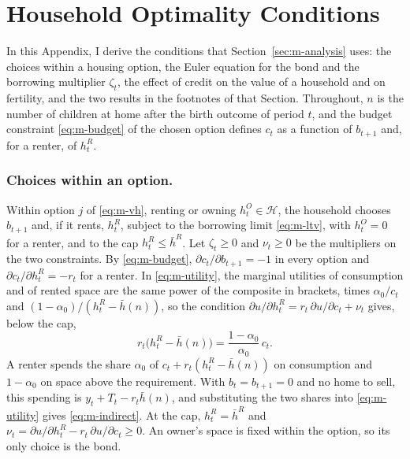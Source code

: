 \section{Household Optimality Conditions}
\label{app:household}

In this Appendix, I derive the conditions that Section~\ref{sec:m-analysis}
uses: the choices within a housing option, the Euler equation for the bond
and the borrowing multiplier $\zeta_t$, the effect of credit on the value of
a household and on fertility, and the two results in the footnotes of that
Section. Throughout, $n$ is the number of children at home after the birth
outcome of period $t$, and the budget constraint \eqref{eq:m-budget} of the
chosen option defines $c_t$ as a function of $b_{t+1}$ and, for a renter, of
$h^R_t$.

\subsubsection*{Choices within an option.}
Within option $j$ of \eqref{eq:m-vh}, renting or owning $h^O_t\in\mathcal H$,
the household chooses $b_{t+1}$ and, if it rents, $h^R_t$, subject to the
borrowing limit \eqref{eq:m-ltv}, with $h^O_t=0$ for a renter, and to the
cap $h^R_t\le\bar h^R$. Let $\zeta_t\ge0$ and $\nu_t\ge0$ be the multipliers
on the two constraints. By \eqref{eq:m-budget},
$\partial c_t/\partial b_{t+1}=-1$ in every option and
$\partial c_t/\partial h^R_t=-r_t$ for a renter. In \eqref{eq:m-utility}, the
marginal utilities of consumption and of rented space are the same power of
the composite in brackets, times $\alpha_0/c_t$ and
$(1-\alpha_0)/(h^R_t-\bar h(n))$, so the condition
$\partial u/\partial h^R_t=r_t\,\partial u/\partial c_t+\nu_t$ gives, below
the cap,
\begin{equation}
 r_t\bigl(h^R_t-\bar h(n)\bigr)=\frac{1-\alpha_0}{\alpha_0}\,c_t .
 \label{eq:app-intra}
\end{equation}
A renter spends the share $\alpha_0$ of $c_t+r_t(h^R_t-\bar h(n))$ on
consumption and $1-\alpha_0$ on space above the requirement. With
$b_t=b_{t+1}=0$ and no home to sell, this spending is
$y_t+T_t-r_t\bar h(n)$, and substituting the two shares into
\eqref{eq:m-utility} gives \eqref{eq:m-indirect}. At the cap,
$h^R_t=\bar h^R$ and
$\nu_t=\partial u/\partial h^R_t-r_t\,\partial u/\partial c_t\ge0$. An
owner's space is fixed within the option, so its only choice is the bond.

